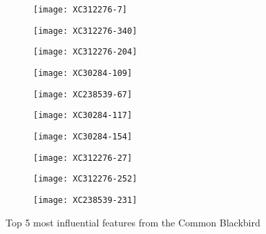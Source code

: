 \begin{figure}[!htb]
  \centering
  \begin{subfigure}[b]{0.2\textwidth}
    \centering
    \texttt{[image: XC312276-7]}
  \end{subfigure}%
  \begin{subfigure}[b]{0.2\textwidth}
    \centering
    \texttt{[image: XC312276-340]}
  \end{subfigure}%
  \begin{subfigure}[b]{0.2\textwidth}
    \centering
    \texttt{[image: XC312276-204]}
  \end{subfigure}%
  \begin{subfigure}[b]{0.2\textwidth}
    \centering
    \texttt{[image: XC30284-109]}
  \end{subfigure}%
  \begin{subfigure}[b]{0.2\textwidth}
    \centering
    \texttt{[image: XC238539-67]}
  \end{subfigure}
  \begin{subfigure}[b]{0.2\textwidth}
    \centering
    \texttt{[image: XC30284-117]}
  \end{subfigure}%
  \begin{subfigure}[b]{0.2\textwidth}
    \centering
    \texttt{[image: XC30284-154]}
  \end{subfigure}%
  \begin{subfigure}[b]{0.2\textwidth}
    \centering
    \texttt{[image: XC312276-27]}
  \end{subfigure}%
  \begin{subfigure}[b]{0.2\textwidth}
    \centering
    \texttt{[image: XC312276-252]}
  \end{subfigure}%
  \begin{subfigure}[b]{0.2\textwidth}
    \centering
    \texttt{[image: XC238539-231]}
  \end{subfigure}
  \caption{Top 5 most influential features from the Common Blackbird}
  \label{fig:impt2}
\end{figure}
